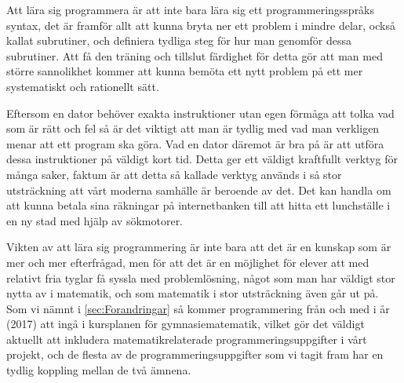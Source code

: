 \textcolor{Mahogany}{Att lära sig programmera är att inte bara lära sig ett programmeringsspråks syntax, det är framför allt att kunna bryta ner ett problem i mindre delar, också kallat subrutiner, och definiera tydliga steg för hur man genomför dessa subrutiner. Att få den träning och tillslut färdighet för detta gör att man med större sannolikhet kommer att kunna bemöta ett nytt problem på ett mer systematiskt och rationellt sätt.}

\textcolor{Mahogany}{Eftersom en dator behöver exakta instruktioner utan egen förmåga att tolka vad som är rätt och fel så är det viktigt att man är tydlig med vad man verkligen menar att ett program ska göra. Vad en dator däremot är bra på är att utföra dessa instruktioner på väldigt kort tid. Detta ger ett väldigt kraftfullt verktyg för många saker, faktum är att detta så kallade verktyg används i så stor utsträckning att vårt moderna samhälle är beroende av det. Det kan handla om att kunna betala sina räkningar på internetbanken till att hitta ett lunchställe i en ny stad med hjälp av sökmotorer.}

\textcolor{Mahogany}{Vikten av att lära sig programmering är inte bara att det är en kunskap som är mer och mer efterfrågad, men för att det är en möjlighet för elever att med relativt fria tyglar få syssla med problemlösning, något som man har väldigt stor nytta av i matematik\cite{TheElephant}, och som matematik i stor utsträckning även går ut på. Som vi nämnt i \ref{sec:Forandringar} så kommer programmering från och med i år (2017) att ingå i kursplanen för gymnasiematematik, vilket gör det väldigt aktuellt att inkludera matematikrelaterade programmeringsuppgifter i vårt projekt, och de flesta av de programmeringsuppgifter som vi tagit fram har en tydlig koppling mellan de två ämnena.}